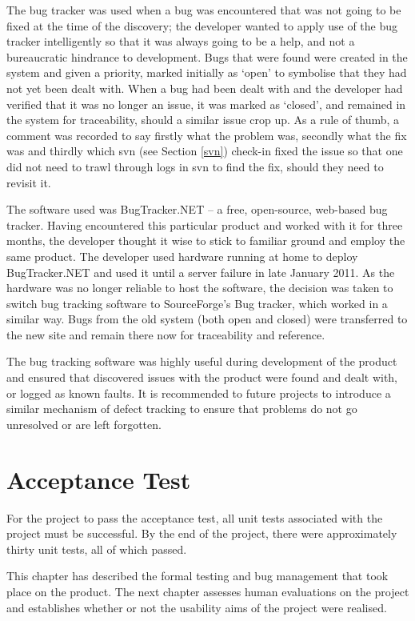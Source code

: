 The bug tracker was used when a bug was encountered that was not going to be fixed at the time of the discovery; the developer wanted to apply use of the bug tracker intelligently so that it was always going to be a help, and not a bureaucratic hindrance to development.  Bugs that were found were created in the system and given a priority, marked initially as `open' to symbolise that they had not yet been dealt with.  When a bug had been dealt with and the developer had verified that it was no longer an issue, it was marked as `closed', and remained in the system for traceability, should a similar issue crop up.  As a rule of thumb, a comment was recorded to say firstly what the problem was, secondly what the fix was and thirdly which \gls{svn} (see Section \ref{svn}) check-in fixed the issue so that one did not need to trawl through logs in \gls{svn} to find the fix, should they need to revisit it.

The software used was BugTracker.NET -- a free, open-source, web-based bug tracker.  Having encountered this particular product and worked with it for three months, the developer thought it wise to stick to familiar ground and employ the same product.  The developer used hardware running at home to deploy BugTracker.NET and used it until a server failure in late January 2011.  As the hardware was no longer reliable to host the software, the decision was taken to switch bug tracking software to SourceForge's Bug tracker, which worked in a similar way.  Bugs from the old system (both open and closed) were transferred to the new site and remain there now for traceability and reference.

The bug tracking software was highly useful during development of the product and ensured that discovered issues with the product were found and dealt with, or logged as known faults.  It is recommended to future projects to introduce a similar mechanism of defect tracking to ensure that problems do not go unresolved or are left forgotten.

\section{Acceptance Test}
For the project to pass the acceptance test, all unit tests associated with the project must be successful.  By the end of the project, there were approximately thirty unit tests, all of which passed.

This chapter has described the formal testing and bug management that took place on the product.  The next chapter assesses human evaluations on the project and establishes whether or not the usability aims of the project were realised.